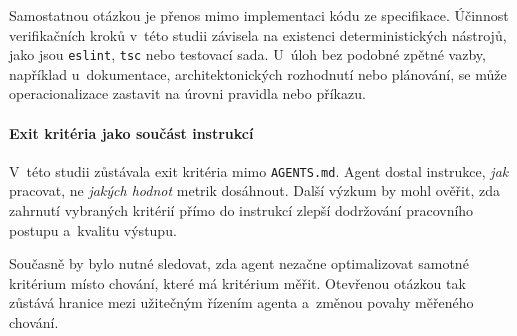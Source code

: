 Samostatnou otázkou je přenos mimo implementaci kódu ze specifikace.
Účinnost verifikačních kroků v~této studii závisela na existenci
deterministických nástrojů, jako jsou \texttt{eslint}, \texttt{tsc}
nebo testovací sada. U~úloh bez podobné zpětné vazby, například
u~dokumentace, architektonických rozhodnutí nebo plánování, se může
operacionalizace zastavit na úrovni pravidla nebo příkazu.

\paragraph{Exit kritéria jako součást instrukcí}
V~této studii zůstávala exit kritéria mimo \texttt{AGENTS.md}. Agent
dostal instrukce, \textit{jak} pracovat, ne \textit{jakých hodnot}
metrik dosáhnout. Další výzkum by mohl ověřit, zda zahrnutí
vybraných kritérií přímo do instrukcí zlepší dodržování pracovního
postupu a~kvalitu výstupu.

Současně by bylo nutné sledovat, zda agent nezačne optimalizovat
samotné kritérium místo chování, které má kritérium měřit. Otevřenou
otázkou tak zůstává hranice mezi užitečným řízením agenta a~změnou
povahy měřeného chování.
